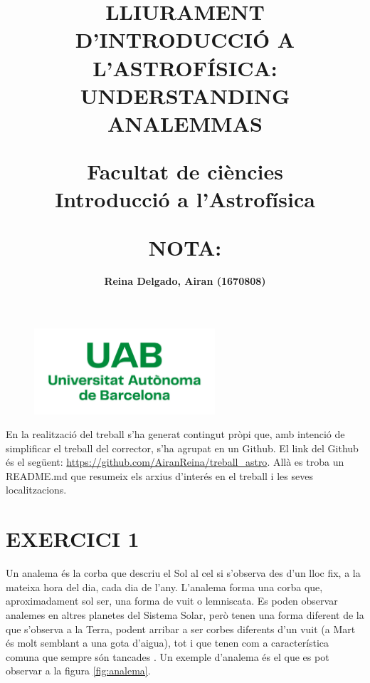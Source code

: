 \documentclass[a4paper, 11pt]{article}
\begin{document}
\begin{figure}
    \centering
    \includegraphics[width=0.6\textwidth]{images/Logo_uab.png}
    \label{uab}
\end{figure}

\title{{\textbf{\Large LLIURAMENT D'INTRODUCCIÓ A L'ASTROFÍSICA: UNDERSTANDING ANALEMMAS
}\\}

\vspace{12mm}

{\large Facultat de ciències}\\
{\large Introducció a l'Astrofísica}}

\author{\textbf{Reina Delgado, Airan (1670808)}}
\date{}


\maketitle

\vspace{70mm} \title{\textbf{\Large NOTA:}}



    \vspace{4mm} 
    \noindent En la realització del treball s'ha generat contingut pròpi que, amb intenció de simplificar el treball del corrector, s'ha agrupat en un Github. El link del Github és el següent: \url{https://github.com/AiranReina/treball_astro}. Allà es troba un README.md que resumeix els arxius d'interés en el treball i les seves localitzacions. 
    \newpage


\section*{EXERCICI 1}

\noindent Un analema és la corba que descriu el Sol al cel si s’observa des d'un lloc fix, a la mateixa hora del dia, cada dia de l’any. L’analema forma una corba que, aproximadament sol ser, una forma de vuit o lemniscata. Es poden observar analemes en altres planetes del Sistema Solar, però tenen una forma diferent de la que s’observa a la Terra, podent arribar a ser corbes diferents d’un vuit (a Mart és molt semblant a una gota d’aigua), tot i que tenen com a característica comuna que sempre són tancades \cite{DEFINICIO_ANALEMA}. Un exemple d’analema és el que es pot observar a la figura \ref{fig:analema}.
\end{document}
